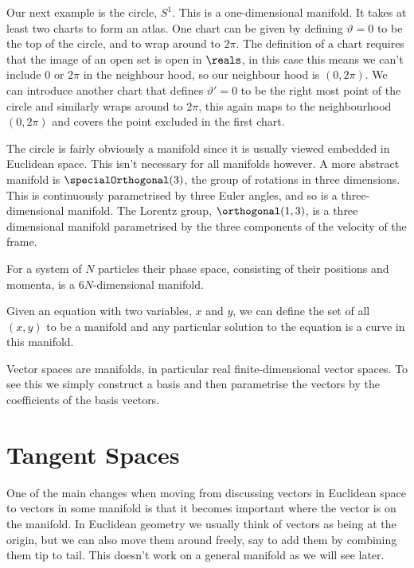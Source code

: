 Our next example is the circle, \(S^1\).
This is a one-dimensional manifold.
It takes at least two charts to form an atlas.
One chart can be given by defining \(\vartheta = 0\) to be the top of the circle, and to wrap around to \(2\pi\).
The definition of a chart requires that the image of an open set is open in \(\reals\), in this case this means we can't include \(0\) or \(2\pi\) in the neighbour hood, so our neighbour hood is \((0, 2\pi)\).
We can introduce another chart that defines \(\vartheta' = 0\) to be the right most point of the circle and similarly wraps around to \(2\pi\), this again maps to the neighbourhood \((0, 2\pi)\) and covers the point excluded in the first chart.

The circle is fairly obviously a manifold since it is usually viewed embedded in Euclidean space.
This isn't necessary for all manifolds however.
A more abstract manifold is \(\specialOrthogonal(3)\), the group of rotations in three dimensions.
This is continuously parametrised by three Euler angles, and so is a three-dimensional manifold.
The Lorentz group, \(\orthogonal(1, 3)\), is a three dimensional manifold parametrised by the three components of the velocity of the frame.

For a system of \(N\) particles their phase space, consisting of their positions and momenta, is a \(6N\)-dimensional manifold.

Given an equation with two variables, \(x\) and \(y\), we can define the set of all \((x, y)\) to be a manifold and any particular solution to the equation is a curve in this manifold.

Vector spaces are manifolds, in particular real finite-dimensional vector spaces.
To see this we simply construct a basis and then parametrise the vectors by the coefficients of the basis vectors.

\section{Tangent Spaces}
One of the main changes when moving from discussing vectors in Euclidean space to vectors in some manifold is that it becomes important where the vector is on the manifold.
In Euclidean geometry we usually think of vectors as being at the origin, but we can also move them around freely, say to add them by combining them tip to tail.
This doesn't work on a general manifold as we will see later.

